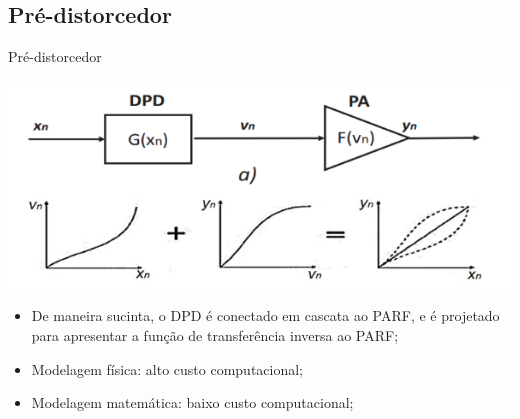 \documentclass{if-beamer}
\begin{document}
\subsection{Pré-distorcedor}
\begin{frame}{Pré-distorcedor}
\begin{minipage}{0.5\textwidth}
		
		\includegraphics[scale=0.5]{DPDCascata.png}
		
	\end{minipage}%
	\hspace{0.04\textwidth}
	\begin{minipage}{0.5\textwidth}
		\begin{itemize}
			\item De maneira sucinta, o DPD é conectado em 
			cascata ao PARF, e é projetado para apresentar a 
			função de transferência inversa ao PARF;
			\item Modelagem física: alto custo computacional;
			\item Modelagem matemática: baixo custo computacional;
		\end{itemize}
	\end{minipage}
\end{frame}
\end{document}
